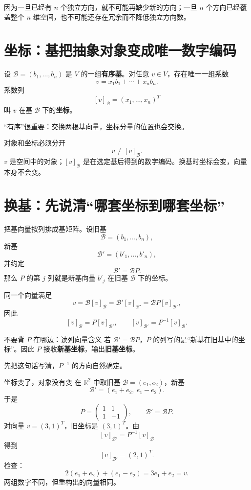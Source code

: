 \documentclass[11pt,a4paper]{ctexart}
\newcommand{\kw}[1]{\textbf{\color{deep}#1}}
\begin{document}
因为一旦已经有 $n$ 个独立方向，就不可能再缺少新的方向；一旦 $n$ 个方向已经覆盖整个 $n$ 维空间，也不可能还存在冗余而不降低独立方向数。

\section{坐标：基把抽象对象变成唯一数字编码}

设 $\mathcal B=(b_1,\dots,b_n)$ 是 $V$ 的一组\kw{有序基}。对任意 $v\in V$，存在唯一一组系数
\[
v=x_1b_1+\cdots+x_nb_n.
\]
系数列
\[
[v]_{\mathcal B}=(x_1,\dots,x_n)^T
\]
叫 $v$ 在基 $\mathcal B$ 下的\kw{坐标}。

“有序”很重要：交换两根基向量，坐标分量的位置也会交换。

\begin{corebox}{对象和坐标必须分开}
\[
\boxed{v\neq[v]_{\mathcal B}.}
\]
$v$ 是空间中的对象；$[v]_{\mathcal B}$ 是在选定基后得到的数字编码。换基时坐标会变，向量本身不会变。
\end{corebox}

\section{换基：先说清“哪套坐标到哪套坐标”}

把基向量按列排成基矩阵。设旧基
\[
\mathcal B=(b_1,\dots,b_n),
\]
新基
\[
\mathcal B'=(b'_1,\dots,b'_n),
\]
并约定
\[
\mathcal B'=\mathcal BP.
\]
那么 $P$ 的第 $j$ 列就是新基向量 $b'_j$ 在旧基 $\mathcal B$ 下的坐标。

同一个向量满足
\[
v=\mathcal B[v]_{\mathcal B}
=\mathcal B'[v]_{\mathcal B'}
=\mathcal BP[v]_{\mathcal B'},
\]
因此
\[
\boxed{[v]_{\mathcal B}=P[v]_{\mathcal B'},
\qquad
[v]_{\mathcal B'}=P^{-1}[v]_{\mathcal B}.}
\]

\begin{methodbox}{不要背 $P$ 在哪边：读列向量含义}
若 $\mathcal B'=\mathcal BP$，$P$ 的列写的是“新基在旧基中的坐标”。因此 $P$ 接收\kw{新基坐标}，输出\kw{旧基坐标}。

先把这句话写清，$P^{-1}$ 的方向自然确定。
\end{methodbox}

\begin{examplebox}{坐标变了，对象没有变}
在 $\mathbb R^2$ 中取旧基 $\mathcal B=(e_1,e_2)$，新基
\[
\mathcal B'=(e_1+e_2,\ e_1-e_2).
\]
于是
\[
P=\begin{pmatrix}1&1\\1&-1\end{pmatrix},
\qquad \mathcal B'=\mathcal BP.
\]
对向量 $v=(3,1)^T$，旧坐标是 $(3,1)^T$。由
\[
[v]_{\mathcal B'}=P^{-1}[v]_{\mathcal B}
\]
得到
\[
[v]_{\mathcal B'}=(2,1)^T.
\]
检查：
\[
2(e_1+e_2)+(e_1-e_2)=3e_1+e_2=v.
\]
两组数字不同，但重构出的向量相同。
\end{examplebox}
\end{document}
